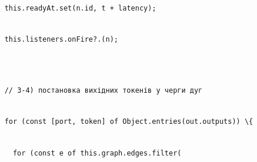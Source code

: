 \documentclass[
]{article}
\newcommand{\passthrough}[1]{#1}
\begin{document}
\passthrough{\lstinline!    !}\passthrough{\lstinline!this!}\passthrough{\lstinline!.!}\passthrough{\lstinline!readyAt!}\passthrough{\lstinline!.!}\passthrough{\lstinline!set!}\passthrough{\lstinline!(!}\passthrough{\lstinline!n!}\passthrough{\lstinline!.!}\passthrough{\lstinline!id!}\passthrough{\lstinline!,!}\passthrough{\lstinline! !}\passthrough{\lstinline!t!}\passthrough{\lstinline! !}\passthrough{\lstinline!+!}\passthrough{\lstinline! !}\passthrough{\lstinline!latency!}\passthrough{\lstinline!);!}\strut \\
\passthrough{\lstinline!    !}\passthrough{\lstinline!this!}\passthrough{\lstinline!.!}\passthrough{\lstinline!listeners!}\passthrough{\lstinline!.!}\passthrough{\lstinline!onFire!}\passthrough{\lstinline!?.(!}\passthrough{\lstinline!n!}\passthrough{\lstinline!);!}\strut \\
\strut \\
\passthrough{\lstinline!    !}\passthrough{\lstinline!//!}\passthrough{\lstinline! !}\passthrough{\lstinline!3-4)!}\passthrough{\lstinline! !}\passthrough{\lstinline!постановка!}\passthrough{\lstinline! !}\passthrough{\lstinline!вихідних!}\passthrough{\lstinline! !}\passthrough{\lstinline!токенів!}\passthrough{\lstinline! !}\passthrough{\lstinline!у!}\passthrough{\lstinline! !}\passthrough{\lstinline!черги!}\passthrough{\lstinline! !}\passthrough{\lstinline!дуг!}\strut \\
\passthrough{\lstinline!    !}\passthrough{\lstinline!for!}\passthrough{\lstinline! !}\passthrough{\lstinline!(!}\passthrough{\lstinline!const!}\passthrough{\lstinline! !}\passthrough{\lstinline![!}\passthrough{\lstinline!port!}\passthrough{\lstinline!,!}\passthrough{\lstinline! !}\passthrough{\lstinline!token!}\passthrough{\lstinline!]!}\passthrough{\lstinline! !}\passthrough{\lstinline!of!}\passthrough{\lstinline! !}\passthrough{\lstinline!Object!}\passthrough{\lstinline!.!}\passthrough{\lstinline!entries!}\passthrough{\lstinline!(!}\passthrough{\lstinline!out!}\passthrough{\lstinline!.!}\passthrough{\lstinline!outputs!}\passthrough{\lstinline!))!}\passthrough{\lstinline! !}\passthrough{\lstinline!\{!}\strut \\
\passthrough{\lstinline!      !}\passthrough{\lstinline!for!}\passthrough{\lstinline! !}\passthrough{\lstinline!(!}\passthrough{\lstinline!const!}\passthrough{\lstinline! !}\passthrough{\lstinline!e!}\passthrough{\lstinline! !}\passthrough{\lstinline!of!}\passthrough{\lstinline! !}\passthrough{\lstinline!this!}\passthrough{\lstinline!.!}\passthrough{\lstinline!graph!}\passthrough{\lstinline!.!}\passthrough{\lstinline!edges!}\passthrough{\lstinline!.!}\passthrough{\lstinline!filter!}\passthrough{\lstinline!(!}\strut \\
\end{document}
